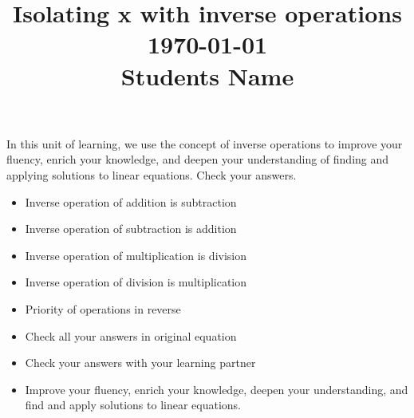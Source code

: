 \documentclass[12pt, a4paper, addpoints]{exam}
\title{\large Isolating x with inverse operations    \\ \dayofweekname{\day}{\month}{\year} \today \\\vspace{2mm} \quad  Students Name \underline{\hspace{8cm}}}
\date{}
\begin{document}
\thispagestyle{empty} 

\maketitle

\LARGE 

\noindent 
In this unit of learning, we use the concept of inverse operations to improve your fluency, enrich your knowledge, and deepen your understanding of finding and applying solutions to linear equations. Check your answers.
\setlength{\columnsep}{1pt}
\thispagestyle{empty} 
\begin{questions}

\begin{mdframed}[backgroundcolor=gray!10]
\begin{multicols}{2}
\large
\begin{itemize}
\item Inverse operation of addition is subtraction
\item Inverse operation of subtraction is addition
\item Inverse operation of multiplication is division
\item Inverse operation of division is multiplication
\item Priority of operations in reverse
\item Check all your answers in original equation 
\item Check your answers with your learning partner
\item Improve your fluency, enrich your knowledge, deepen your understanding, and find and apply solutions to linear equations.
\end{itemize}
\end{multicols}
\end{mdframed}
\small
\begin{multicols}{2}
\tableofcontents
\end{multicols}
\newpage

\Large

\newpage

\newpage

\newpage

\newpage


\end{questions}
\end{document}
